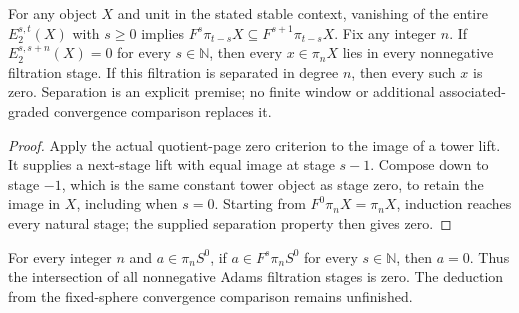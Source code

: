 \begin{lemma}
  \label{lem:adams-e2-vanishing-separated}
  \leanok
  For any object $X$ and unit in the stated stable context, vanishing of
  the entire $E_2^{s,t}(X)$ with $s\ge0$ implies
  $F^s\pi_{t-s}X\subseteq F^{s+1}\pi_{t-s}X$.
  Fix any integer $n$. If $E_2^{s,s+n}(X)=0$ for every $s\in\mathbb N$,
  then every $x\in\pi_nX$ lies in every nonnegative filtration stage.
  If this filtration is separated in degree $n$, then every such $x$ is zero.
  Separation is an explicit premise; no finite window or additional
  associated-graded convergence comparison replaces it.
\end{lemma}
\begin{proof}
  \leanok
  Apply the actual quotient-page zero criterion to the image of a tower
  lift. It supplies a next-stage lift with equal image at stage $s-1$.
  Compose down to stage $-1$, which is the same constant tower object
  as stage zero, to retain the image in $X$, including when $s=0$.
  Starting from $F^0\pi_nX=\pi_nX$, induction reaches every natural stage;
  the supplied separation property then gives zero.
\end{proof}

\begin{proposition}
  \label{prop:fixed-sphere-adams-separated}
  \notready
  For every integer $n$ and $a\in\pi_nS^0$, if
  $a\in F^s\pi_nS^0$ for every $s\in\mathbb N$, then $a=0$.
  Thus the intersection of all nonnegative Adams filtration stages is zero.
  The deduction from the fixed-sphere convergence comparison remains
  unfinished.
\end{proposition}

